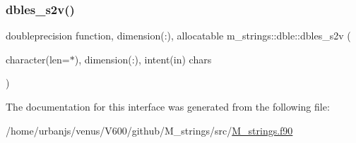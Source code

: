 \subsubsection{\texorpdfstring{dbles\+\_\+s2v()}{dbles\_s2v()}}
{\footnotesize\ttfamily doubleprecision function, dimension(\+:), allocatable m\+\_\+strings\+::dble\+::dbles\+\_\+s2v (\begin{DoxyParamCaption}\item[{character(len=$\ast$), dimension(\+:), intent(in)}]{chars }\end{DoxyParamCaption})\hspace{0.3cm}{\ttfamily [private]}}



The documentation for this interface was generated from the following file\+:\begin{DoxyCompactItemize}
\item 
/home/urbanjs/venus/\+V600/github/\+M\+\_\+strings/src/\mbox{\hyperlink{M__strings_8f90}{M\+\_\+strings.\+f90}}\end{DoxyCompactItemize}
